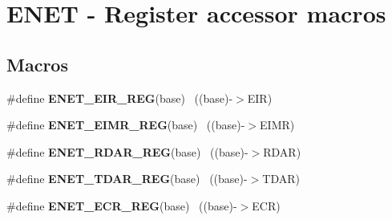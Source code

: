 \hypertarget{group___e_n_e_t___register___accessor___macros}{}\section{E\+N\+E\+T -\/ Register accessor macros}
\label{group___e_n_e_t___register___accessor___macros}
\subsection*{Macros}
\begin{DoxyCompactItemize}
\item 
\hypertarget{group___e_n_e_t___register___accessor___macros_ga309b10ca125370745d9fc098345453c7}{}\#define {\bfseries E\+N\+E\+T\+\_\+\+E\+I\+R\+\_\+\+R\+E\+G}(base)                                          ~((base)-\/$>$E\+I\+R)\label{group___e_n_e_t___register___accessor___macros_ga309b10ca125370745d9fc098345453c7}

\item 
\hypertarget{group___e_n_e_t___register___accessor___macros_ga5e6413530cef68a9768f22e6148cbb6c}{}\#define {\bfseries E\+N\+E\+T\+\_\+\+E\+I\+M\+R\+\_\+\+R\+E\+G}(base)                                        ~((base)-\/$>$E\+I\+M\+R)\label{group___e_n_e_t___register___accessor___macros_ga5e6413530cef68a9768f22e6148cbb6c}

\item 
\hypertarget{group___e_n_e_t___register___accessor___macros_ga73f8eb2545f5cdc7a0095b87ed902213}{}\#define {\bfseries E\+N\+E\+T\+\_\+\+R\+D\+A\+R\+\_\+\+R\+E\+G}(base)                                        ~((base)-\/$>$R\+D\+A\+R)\label{group___e_n_e_t___register___accessor___macros_ga73f8eb2545f5cdc7a0095b87ed902213}

\item 
\hypertarget{group___e_n_e_t___register___accessor___macros_gaeeee055913170a4ef7b66f5524b21302}{}\#define {\bfseries E\+N\+E\+T\+\_\+\+T\+D\+A\+R\+\_\+\+R\+E\+G}(base)                                        ~((base)-\/$>$T\+D\+A\+R)\label{group___e_n_e_t___register___accessor___macros_gaeeee055913170a4ef7b66f5524b21302}

\item 
\hypertarget{group___e_n_e_t___register___accessor___macros_gac227c2b205699aa7200f2e87a1015627}{}\#define {\bfseries E\+N\+E\+T\+\_\+\+E\+C\+R\+\_\+\+R\+E\+G}(base)                                          ~((base)-\/$>$E\+C\+R)\label{group___e_n_e_t___register___accessor___macros_gac227c2b205699aa7200f2e87a1015627}


\end{DoxyCompactItemize}
